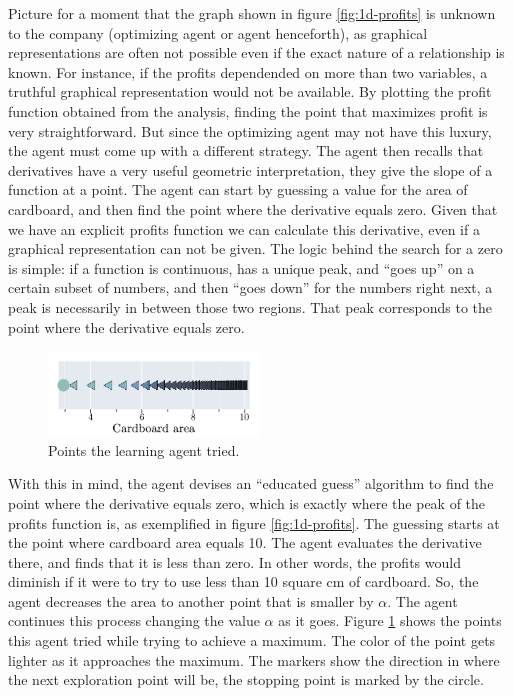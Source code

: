 Picture for a moment that the graph shown in figure \ref{fig:1d-profits} is
unknown to the company (optimizing agent or agent henceforth), as graphical
representations are often not possible even if the exact nature of a
relationship is known. For instance, if the profits dependended on more than two
variables, a truthful graphical representation would not be available. By
plotting the profit function obtained from the analysis, finding the point that
maximizes profit is very straightforward. But since the optimizing agent may not
have this luxury, the agent must come up with a different strategy. The agent
then recalls that derivatives have a very useful geometric interpretation, they
give the slope of a function at a point. The agent can start by guessing a value
for the area of cardboard, and then find the point where the derivative equals
zero. Given that we have an explicit profits function we can calculate this
derivative, even if a graphical representation can not be given. The logic
behind the search for a zero is simple: if a function is continuous, has a
unique peak, and ``goes up'' on a certain subset of numbers, and then ``goes
down'' for the numbers right next, a peak is necessarily in between those two
regions. That peak corresponds to the point where the derivative equals zero.

\begin{figure}
   \centering
   \includegraphics[width=0.5\textwidth]{img/gd-points.pdf} 
   \caption{Points the learning agent tried.}
   \label{fig:gd-points}
\end{figure}

With this in mind, the agent devises an ``educated guess'' algorithm to find the
point where the derivative equals zero, which is exactly where the peak of the
profits function is, as exemplified in figure \ref{fig:1d-profits}. The guessing
starts at the point where cardboard area equals 10. The agent evaluates the
derivative there, and finds that it is less than zero. In other words, the
profits would diminish if it were to try to use less than 10 square cm of
cardboard. So, the agent decreases the area to another point that is smaller by
$\alpha$. The agent continues this process changing the value $\alpha$ as it
goes. Figure \ref{fig:gd-points} shows the points this agent tried while trying
to achieve a maximum. The color of the point gets lighter as it approaches the
maximum. The markers show the direction in where the next exploration point will
be, the stopping point is marked by the circle.

